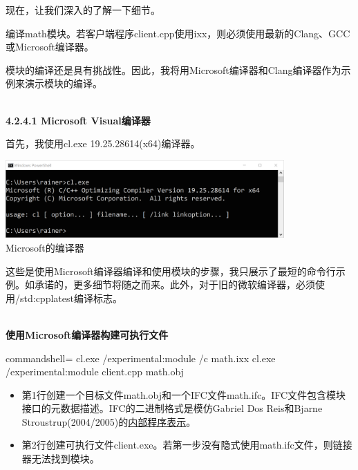 现在，让我们深入的了解一下细节。


编译math模块。若客户端程序client.cpp使用ixx，则必须使用最新的Clang、GCC或Microsoft编译器。

模块的编译还是具有挑战性。因此，我将用Microsoft编译器和Clang编译器作为示例来演示模块的编译。

\hspace*{\fill} \\ %
\noindent
\textbf{4.2.4.1\hspace{0.2cm} Microsoft Visual编译器}

首先，我使用cl.exe 19.25.28614(x64)编译器。

\begin{center}
\includegraphics[width=0.8\textwidth]{content/3/chapter4/images/18.png}\\
Microsoft的编译器
\end{center}

这些是使用Microsoft编译器编译和使用模块的步骤，我只展示了最短的命令行示例。如承诺的，更多细节将随之而来。此外，对于旧的微软编译器，必须使用/std:cpplatest编译标志。

\hspace*{\fill} \\ %
\noindent
\textbf{使用Microsoft编译器构建可执行文件}
\begin{tcblisting}{commandshell={}}
cl.exe /experimental:module /c math.ixx
cl.exe /experimental:module client.cpp math.obj
\end{tcblisting}

\begin{itemize}
\item 
第1行创建一个目标文件math.obj和一个IFC文件math.ifc。IFC文件包含模块接口的元数据描述。IFC的二进制格式是模仿Gabriel Dos Reis和Bjarne Stroustrup(2004/2005)的\href{https://www.stroustrup.com/gdr-bs-macis09.pdf}{内部程序表示}。

\item 
第2行创建可执行文件client.exe。若第一步没有隐式使用math.ifc文件，则链接器无法找到模块。
\end{itemize}

